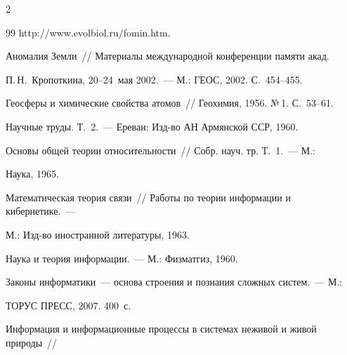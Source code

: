 \begin{multicols}{2}
{{\begin{thebibliography}{99}
{http://www.evolbiol.ru/fomin.htm}.





Аномалия Земли~// Материалы международной конференции памяти акад.\ 

П.\,Н.~Кропоткина, 20--24~мая 2002.~--- М.: ГЕОС, 2002. С.~454--455.





Геосферы и химические свойства атомов~// Геохимия, 1956. №\,1.  С.~53--61.





Научные труды. Т.~2.~--- Ереван: Изд-во АН Армянской ССР, 1960.





Основы общей теории относитель\-ности~// Собр. науч. тр. Т.~1.~--- М.: 

Наука, 1965.





Математическая теория связи~// Работы по теории информации и кибернетике.~--- 

М.: Изд-во иностранной литературы, 1963.







Наука и теория информации.~--- М.: Физматгиз, 1960.







Законы информатики~--- основа строения и познания сложных систем.~--- М.: 

ТОРУС ПРЕСС, 2007.  400~с.





Информация и информационные процессы в системах неживой и живой природы~// 


\end{thebibliography}}}
\end{multicols}
